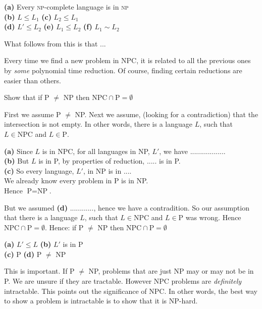 {
\textbf{(a)} Every \textsc{np}-complete language is in \textsc{np} \\
\textbf{(b)} $L \leqslant L_1$ 
\textbf{(c)} $L_2 \leqslant L_1$ \\
\textbf{(d)} $L' \leqslant L_2$ 
\textbf{(e)} $L_1 \leqslant L_2$
\textbf{(f)} $L_1 \sim L_2$
}


What follows from this is that ...


Every time we find a new problem in NPC, it is related to all the 
previous ones by \textit{some} polynomial time reduction. 
Of course, finding certain reductions are easier than others. 


\frmrule

\begin{example}
Show that if P $\neq$ NP then $\text{NPC} \cap \text{P} = \emptyset$

First we assume P $\neq$ NP. Next we assume, (looking for a contradiction) 
that the intersection is not empty. In other words,
there is a language $L$, such that $L \in \text{NPC}$ and $L \in \text{P}$.

\textbf{(a)} Since $L$ is in NPC, for all languages in NP, $L'$, we have .................. \\
\textbf{(b)} But $L$ is in P, by properties of reduction, ..... is in P. \\
\textbf{(c)} So every language, $L'$, in NP is in .... \\
We already know every problem in P is in NP. \\
Hence $\text{P} = \text{NP}$.

But we assumed \textbf{(d)} ............, hence we have a contradition. 
So our assumption that there is a language $L$, such that $L \in \text{NPC}$ and $L \in \text{P}$ 
was wrong. Hence $\text{NPC} \cap \text{P} = \emptyset$. 
Hence: if P $\neq$ NP then $\text{NPC} \cap \text{P} = \emptyset$ 

\end{example}

{
\textbf{(a)} $L' \leqslant L$  
\textbf{(b)} $L'$ is in P \\
\textbf{(c)} P 
\textbf{(d)} P $\neq$ NP
}



This is important. If P $\neq$ NP, problems that are just NP may or 
may not be in P. We are unsure if they are tractable. However NPC 
problems are \textit{definitely} intractable. This points out the 
signiﬁcance of NPC. In other words, 
the best way to show a problem is intractable 
is to show that it is NP-hard.

